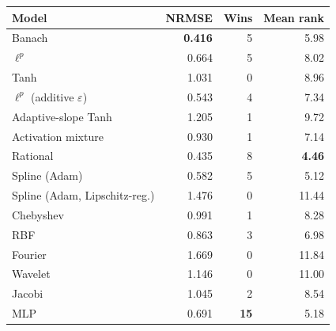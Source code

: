\begin{tabular}{lrrr}
\toprule
Model & NRMSE & Wins & Mean rank \\
\midrule
Banach & \textbf{0.416} & 5 & 5.98 \\
$\ell^p$ & 0.664 & 5 & 8.02 \\
Tanh & 1.031 & 0 & 8.96 \\
$\ell^p$ (additive $\varepsilon$) & 0.543 & 4 & 7.34 \\
Adaptive-slope Tanh & 1.205 & 1 & 9.72 \\
Activation mixture & 0.930 & 1 & 7.14 \\
Rational & 0.435 & 8 & \textbf{4.46} \\
Spline (Adam) & 0.582 & 5 & 5.12 \\
Spline (Adam, Lipschitz-reg.) & 1.476 & 0 & 11.44 \\
Chebyshev & 0.991 & 1 & 8.28 \\
RBF & 0.863 & 3 & 6.98 \\
Fourier & 1.669 & 0 & 11.84 \\
Wavelet & 1.146 & 0 & 11.00 \\
Jacobi & 1.045 & 2 & 8.54 \\
MLP & 0.691 & \textbf{15} & 5.18 \\
\bottomrule\end{tabular}
